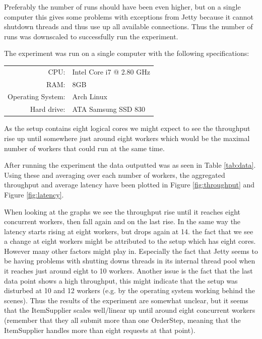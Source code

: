 \documentclass[a4paper, 11pt]{article}
\begin{document}
Preferably the number of runs should have been even higher, but on a single computer this gives some problems with exceptions from Jetty because it cannot shutdown threads and thus use up all available connections. Thus the number of runs was downscaled to successfully run the experiment.

The experiment was run on a single computer with the following specifications:
\begin{table}[H]
\centering
\begin{tabular}{rl}
CPU: & Intel Core i7 @ 2.80 GHz \\
RAM: & 8GB \\
Operating System: & Arch Linux \\
Hard drive: & ATA Samsung SSD 830 \\
\end{tabular}
\end{table}
As the setup contains eight logical cores we might expect to see the throughput rise up until somewhere just around eight workers which would be the maximal number of workers that could run at the same time.

After running the experiment the data outputted was as seen in Table \ref{tab:data}. Using these and averaging over each number of workers, the aggregated throughput and average latency have been plotted in Figure \ref{fig:throughput} and Figure \ref{fig:latency}.

When looking at the graphs we see the throughput rise until it reaches eight concurrent workers, then fall again and on the last rise. In the same way the latency starts rising at eight workers, but drops again at 14. the fact that we see a change at eight workers might be attributed to the setup which has eight cores. However many other factors might play in. Especially the fact that Jetty seems to be having problems with shutting downs threads in its internal thread pool when it reaches just around eight to 10 workers. Another issue is the fact that the last data point shows a high throughput, this might indicate that the setup was disturbed at 10 and 12 workers (e.g. by the operating system working behind the scenes). Thus the results of the experiment are somewhat unclear, but it seems that the ItemSupplier scales well/linear up until around eight concurrent workers (remember that they all submit more than one OrderStep, meaning that the ItemSupplier handles more than eight requests at that point).
\end{document}
